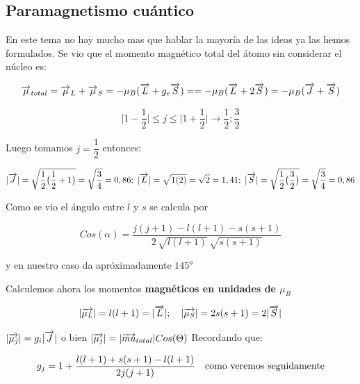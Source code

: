 \subsection{Paramagnetismo cuántico}

En este tema no hay mucho mas que hablar la mayoría de las ideas ya las hemos formulados. Se vio que el momento magnético total del átomo sin considerar el núcleo es:

\begin{equation}
\overrightarrow{\mu}_{total}= \overrightarrow{\mu}_{L}+\overrightarrow{\mu}_{S}=-\mu_{B}(\overrightarrow{L}+g_{e}\overrightarrow{S})= =-\mu_{B}(\overrightarrow{L}+2\overrightarrow{S})=-\mu_{B}(\overrightarrow{J}+\overrightarrow{S}) 
\end{equation}


\begin{equation*}
  \vert 1 - \dfrac{1}{2} \vert \leq j \leq  \vert 1 + \dfrac{1}{2} \vert \rightarrow \dfrac{1}{2}; \dfrac{3}{2}
\end{equation*}

Luego tomamos $j=\dfrac{1}{2}$ entonces:

\begin{equation*}
  |\overrightarrow{J}|=\sqrt{\dfrac{1}{2}\big(\dfrac{1}{2}+1\big)}=\sqrt{\dfrac{3}{4}}=0,86; \; |\overrightarrow{L}|=\sqrt{1(2)}=\sqrt{2}=1,41;\; |\overrightarrow{S}|=\sqrt{\dfrac{1}{2}\big( \dfrac{3}{2} \big)}= \sqrt{\dfrac{3}{4}}=0,86
\end{equation*}

Como se vio el ángulo entre $l$ y $s$ se calcula por

\begin{equation*}
	Cos(\alpha) = \dfrac{j(j+1)-l(l+1)-s(s+1)}{2\,\sqrt{l(l+1)}\,\sqrt{s(s+1)}}
\end{equation*}

y en nuestro caso da apróximadamente $145^{o}$

Calculemos ahora los momentos \textbf{magnéticos en unidades de $\mu_{B}$}

\begin{equation*}
  \vert \overrightarrow{\mu_{L}} \vert= l(l + 1)= \vert \overrightarrow{L} \vert;\quad \vert \overrightarrow{\mu_{S}} \vert=2s(s + 1)=2\vert \overrightarrow{S} \vert
\end{equation*}

$\vert \overrightarrow{\mu_{j}} \vert=g_{i}\vert \overrightarrow{J} \vert$ o bien $\vert \overrightarrow{\mu_{j}} \vert=|\overrightarrow{mu}_{total}|Cos(\Theta)$ Recordando que:

\begin{equation*}
	g_{j}= 1 +\dfrac{l(l + 1)+s(s + 1)-l(l + 1)}{2j(j + 1)} \quad \text{como veremos seguidamente}
\end{equation*} 


